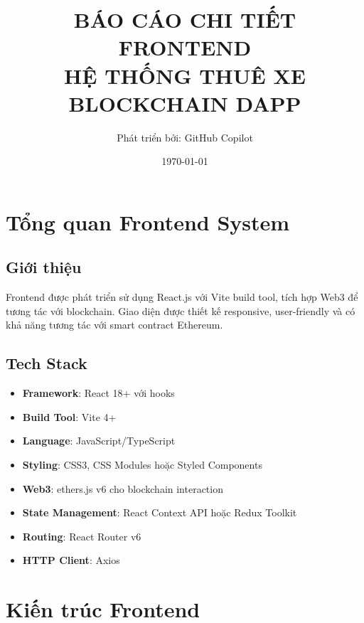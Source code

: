 \documentclass[12pt,a4paper]{article}
\title{\textbf{BÁO CÁO CHI TIẾT FRONTEND} \\ 
       \textbf{HỆ THỐNG THUÊ XE BLOCKCHAIN DAPP}}
\author{Phát triển bởi: GitHub Copilot}
\date{\today}
\begin{document}
\maketitle
\tableofcontents
\newpage

\section{Tổng quan Frontend System}

\subsection{Giới thiệu}
Frontend được phát triển sử dụng React.js với Vite build tool, tích hợp Web3 để tương tác với blockchain. Giao diện được thiết kế responsive, user-friendly và có khả năng tương tác với smart contract Ethereum.

\subsection{Tech Stack}
\begin{itemize}
    \item \textbf{Framework}: React 18+ với hooks
    \item \textbf{Build Tool}: Vite 4+
    \item \textbf{Language}: JavaScript/TypeScript
    \item \textbf{Styling}: CSS3, CSS Modules hoặc Styled Components
    \item \textbf{Web3}: ethers.js v6 cho blockchain interaction
    \item \textbf{State Management}: React Context API hoặc Redux Toolkit
    \item \textbf{Routing}: React Router v6
    \item \textbf{HTTP Client}: Axios
\end{itemize}

\section{Kiến trúc Frontend}
\end{document}
